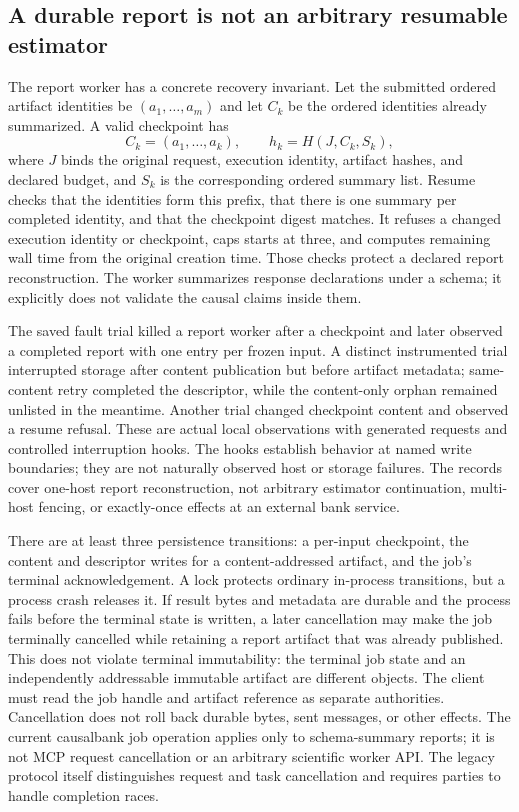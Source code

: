 \subsection{A durable report is not an arbitrary resumable estimator}
\label{exec17:continuity-jobs}

The report worker has a concrete recovery invariant. Let the submitted ordered
artifact identities be $(a_1,\ldots,a_m)$ and let $C_k$ be the ordered
identities already summarized. A valid checkpoint has
\[
 C_k=(a_1,\ldots,a_k),\qquad
 h_k=H(J,C_k,S_k),
\]
where $J$ binds the original request, execution identity, artifact hashes,
and declared budget, and $S_k$ is the corresponding ordered summary list.
Resume checks that the identities form this prefix, that there is one summary
per completed identity, and that the checkpoint digest matches. It refuses a
changed execution identity or checkpoint, caps starts at three, and computes
remaining wall time from the original creation time. Those checks protect a
declared report reconstruction. The worker summarizes response declarations
under a schema; it explicitly does not validate the causal claims inside them.
\citep{exec14_failure_implementation}

The saved fault trial killed a report worker after a checkpoint and later
observed a completed report with one entry per frozen input. A distinct
instrumented trial interrupted storage after content publication but before
artifact metadata; same-content retry completed the descriptor, while the
content-only orphan remained unlisted in the meantime. Another trial changed
checkpoint content and observed a resume refusal. These are actual local
observations with generated requests and controlled interruption hooks. The
hooks establish behavior at named write boundaries; they are not naturally
observed host or storage failures. The records cover one-host report
reconstruction, not arbitrary estimator continuation, multi-host fencing, or
exactly-once effects at an external bank service.
\citep{exec14_failure_observations,exec13_ops_faults}

There are at least three persistence transitions: a per-input checkpoint, the
content and descriptor writes for a content-addressed artifact, and the job's
terminal acknowledgement. A lock protects ordinary in-process transitions,
but a process crash releases it. If result bytes and metadata are durable and
the process fails before the terminal state is written, a later cancellation
may make the job terminally cancelled while retaining a report artifact that
was already published. This does not violate terminal immutability: the
terminal job state and an independently addressable immutable artifact are
different objects. The client must read the job handle and artifact reference
as separate authorities. Cancellation does not roll back durable bytes, sent
messages, or other effects. The current causalbank job operation applies only
to schema-summary reports; it is not MCP request cancellation or an arbitrary
scientific worker API. The legacy protocol itself distinguishes request and
task cancellation and requires parties to handle completion races.
\citep{v12_mcp_legacy_cancellation,exec14_failure_implementation}

